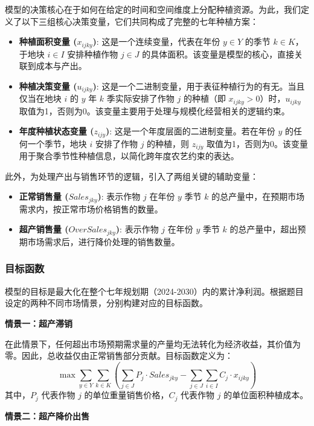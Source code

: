模型的决策核心在于如何在给定的时间和空间维度上分配种植资源。为此，我们定义了以下三组核心决策变量，它们共同构成了完整的七年种植方案：
\begin{itemize}
	\item \textbf{种植面积变量 ($x_{ijky}$)}: 这是一个连续变量，代表在年份 $y \in Y$ 的季节 $k \in K$，于地块 $i \in I$ 安排种植作物 $j \in J$ 的具体面积。该变量是模型的核心，直接关联到成本与产出。
	\item \textbf{种植决策变量 ($u_{ijky}$)}: 这是一个二进制变量，用于表征种植行为的有无。当且仅当在地块 $i$ 的 $y$ 年 $k$ 季实际安排了作物 $j$ 的种植（即 $x_{ijky} > 0$）时，$u_{ijky}$ 取值为1，否则为0。该变量主要用于处理与规模化经营相关的逻辑约束。
	\item \textbf{年度种植状态变量 ($z_{ijy}$)}: 这是一个年度层面的二进制变量。若在年份 $y$ 的任何一个季节，地块 $i$ 安排了作物 $j$ 的种植，则 $z_{ijy}$ 取值为1，否则为0。该变量用于聚合季节性种植信息，以简化跨年度农艺约束的表达。
\end{itemize}
此外，为处理产出与销售环节的逻辑，引入了两组关键的辅助变量：
\begin{itemize}
	\item \textbf{正常销售量 ($Sales_{jky}$)}: 表示作物 $j$ 在年份 $y$ 季节 $k$ 的总产量中，在预期市场需求内，按正常市场价格销售的数量。
	\item \textbf{超产销售量 ($OverSales_{jky}$)}: 表示作物 $j$ 在年份 $y$ 季节 $k$ 的总产量中，超出预期市场需求后，进行降价处理的销售数量。
\end{itemize}

\subsubsection{目标函数}

模型的目标是最大化在整个七年规划期（2024-2030）内的累计净利润。根据题目设定的两种不同市场情景，分别构建对应的目标函数。

\textbf{情景一：超产滞销}

在此情景下，任何超出市场预期需求量的产量均无法转化为经济收益，其价值为零。因此，总收益仅由正常销售部分贡献。目标函数定义为：
\begin{equation}
	\max \sum_{y \in Y} \sum_{k \in K} \left( \sum_{j \in J} P_j \cdot Sales_{jky} - \sum_{j \in J} \sum_{i \in I} C_j \cdot x_{ijky} \right)
\end{equation}
其中，$P_j$ 代表作物 $j$ 的单位重量销售价格，$C_j$ 代表作物 $j$ 的单位面积种植成本。

\textbf{情景二：超产降价出售}

